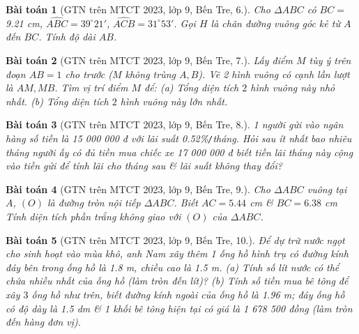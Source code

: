 \documentclass{article}
\newtheorem{baitoan}{Bài toán}
\begin{document}
\begin{baitoan}[GTN trên MTCT 2023, lớp 9, Bến Tre, 6.]
	Cho $\Delta ABC$ có $BC =$ \emph{9.21 cm}, $\widehat{ABC} = 39^\circ21'$, $\widehat{ACB} = 31^\circ53'$. Gọi $H$ là chân đường vuông góc kẻ từ $A$ đến $BC$. Tính độ dài $AB$.
\end{baitoan}

\begin{baitoan}[GTN trên MTCT 2023, lớp 9, Bến Tre, 7.]
	Lấy điểm $M$ tùy ý trên đoạn $AB = 1$ cho trước ($M$ không trùng $A,B$). Vẽ 2 hình vuông có cạnh lần lượt là $AM,MB$. Tìm vị trí điểm $M$ để: (a) Tổng diện tích $2$ hình vuông này nhỏ nhất. (b) Tổng diện tích $2$ hình vuông này lớn nhất.
\end{baitoan}

\begin{baitoan}[GTN trên MTCT 2023, lớp 9, Bến Tre, 8.]
	1 người gửi vào ngân hàng số tiền là \emph{15 000 000 đ} với lãi suất \emph{0.52\%\texttt{/}tháng}. Hỏi sau ít nhất bao nhiêu tháng người ấy có đủ tiền mua chiếc xe \emph{17 000 000 đ} biết tiền lãi tháng này cộng vào tiền gửi để tính lãi cho tháng sau \& lãi suất không thay đổi? 
\end{baitoan}

\begin{baitoan}[GTN trên MTCT 2023, lớp 9, Bến Tre, 9.]
	Cho $\Delta ABC$ vuông tại $A$, $(O)$ là đường tròn nội tiếp $\Delta ABC$. Biết $AC = 5.44$ \emph{cm} \& $BC = 6.38$ \emph{cm} Tính diện tích phần trắng không giao với $(O)$ của $\Delta ABC$.
\end{baitoan}

\begin{baitoan}[GTN trên MTCT 2023, lớp 9, Bến Tre, 10.]
	Để dự trữ nước ngọt cho sinh hoạt vào mùa khô, anh Nam xây thêm 1 ống hồ hình trụ có đường kính đáy bên trong ống hồ là \emph{1.8 m}, chiều cao là \emph{1.5 m}. (a) Tính số lít nước có thể chứa nhiều nhất của ống hồ (làm tròn đến lít)? (b) Tính số tiền mua bê tông để xây $3$ ống hồ như trên, biết đường kính ngoài của ống hồ là \emph{1.96 m}; đáy ống hồ có độ dày là \emph{1.5 dm} \& 1 khối bê tông hiện tại có giá là \emph{1 678 500 đồng} (làm tròn đến hàng đơn vị).
\end{baitoan}


\printbibliography[heading=bibintoc]
	
\end{document}
